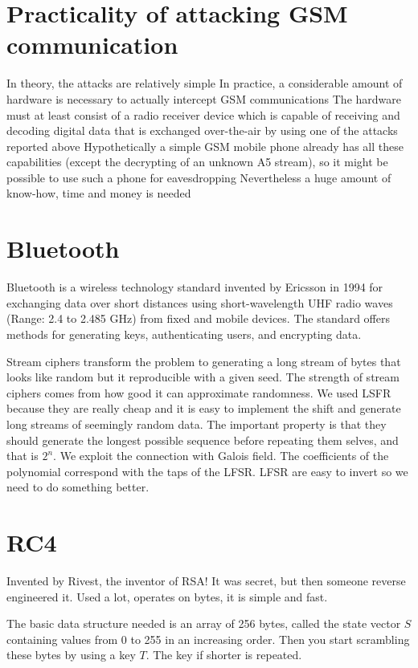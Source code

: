 \section{Practicality of attacking GSM communication}

In theory, the attacks are relatively simple
In practice, a considerable amount of hardware is necessary to actually intercept GSM communications
The hardware must at least consist of a radio receiver device which is capable of receiving and decoding digital data that is exchanged over-the-air by using one of the attacks reported above
Hypothetically a simple GSM mobile phone already has all these capabilities (except the decrypting of an unknown A5 stream), so it might be possible to use such a phone for eavesdropping
Nevertheless a huge amount of know-how, time and money is needed

\section{Bluetooth}
Bluetooth is a wireless technology standard invented by Ericsson in 1994 for exchanging data over short distances using short-wavelength UHF radio waves (Range: 2.4 to 2.485 GHz) from fixed and mobile devices.
The standard offers methods for generating keys, authenticating users, and encrypting data.


Stream ciphers transform the problem to generating a long stream of bytes that looks like random but it reproducible with a given seed. The strength of stream ciphers comes from how good it can approximate randomness. We used LSFR because they are really cheap and it is easy to implement the shift and generate long streams of seemingly random data. The important property is that they should generate the longest possible sequence before repeating them selves, and that is $2^n$. We exploit the connection with Galois field. The coefficients of the polynomial correspond with the taps of the LFSR. LFSR are easy to invert so we need to do something better.

\section{RC4}

Invented by Rivest, the inventor of RSA! It was secret, but then someone reverse engineered it. Used a lot, operates on bytes, it is simple and fast.

The basic data structure needed is an array of 256 bytes, called the state vector $S$ containing values from 0 to 255 in an increasing order. Then you start scrambling these bytes by using a key $T$. The key if shorter is repeated.

